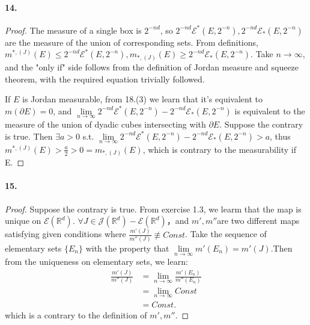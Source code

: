 \documentclass{article}
\begin{document}
\paragraph{14.}
\begin{proof}
The measure of a single box is $2^{-nd}$, so $2^{-nd}\mathcal{E}^*(E,2^{-n}),2^{-nd}\mathcal{E}_*(E,2^{-n})$ are the measure of the union of corresponding sets. From definitions, $m^{*,(J)}(E)\leq 2^{-nd}\mathcal{E}^*(E,2^{-n}), m_{*,(J)}(E)\geq 2^{-nd}\mathcal{E}_*(E,2^{-n})$. Take $n\to\infty$, and the "only if" side follows from the definition of Jordan measure and squeeze theorem, with the required equation trivially followed.

If $E$ is Jordan measurable, from 18.(3) we learn that it's equivalent to $m(\partial E)=0$, and $\lim\limits_{n\to\infty}2^{-nd}\mathcal{E}^*(E,2^{-n})-2^{-nd}\mathcal{E}_*(E,2^{-n})$ is equivalent to the measure of the union of dyadic cubes intersecting with $\partial E$. 
Suppose the contrary is true. Then $\exists a>0$ s.t. $\lim\limits_{n\to\infty}2^{-nd}\mathcal{E}^*(E,2^{-n})-2^{-nd}\mathcal{E}_*(E,2^{-n})>a$, thus $m^{*,(J)}(E)>\frac a 2>0=m_{*,(J)}(E)$, which is contrary to the measurability if E.
\end{proof}

\paragraph{15.}
\begin{proof}
Suppose the contrary is true. From exercise 1.3, we learm that the map is unique on $\mathcal{E}(\mathbb{R}^d)$. $\forall J \in \mathcal{J}(\mathbb{R}^d)-\mathcal{E}(\mathbb{R}^d)$，and $m',m''$are two different maps satisfying given conditions where $\frac {m'(J)}{m''(J)}\not\equiv Const$. Take the sequence of elementary sets $\{E_n\}$ with the property that $\lim\limits_{n\to\infty}m'(E_n)=m'(J)$.Then from the uniqueness on elementary sets, we learn:
\begin{align*}
\frac{m'(J)}{m''(J)}&=\lim_{n\to\infty}\frac {m'(E_n)}{m''(E_n)}\\
&=\lim_{n\to\infty}Const\\
&=Const.
\end{align*}
which is a contrary to the definition of $m',m''$.
\end{proof}
\end{document}
